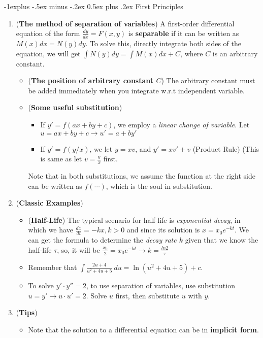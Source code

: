 \documentclass[10pt, landscape]{article}
\makeatletter
\renewcommand{\subsection}{\@startsection{subsection}{2}{0mm}%
                                {-1explus -.5ex minus -.2ex}%
                                {0.5ex plus .2ex}%
                                {\normalfont\normalsize\bfseries}}
\makeatother
\begin{document}
\begin{multicols}{4}
\subsection{First Principles}
\begin{enumerate}
    \item (\textbf{The method of separation of variables}) A first-order differential equation of the form $\frac{dy}{dx}=F(x,y)$ is \textbf{separable} if it can be written as $M(x)dx=N(y)dy$. To solve this, directly integrate both sides of the equation, we will get $\int N(y)dy=\int M(x)dx+C$, where $C$ is an arbitrary constant.
    \begin{itemize}
        \item (\textbf{The position of arbitrary constant $C$}) The arbitrary constant must be added immediately when you integrate w.r.t independent variable.
        \item (\textbf{Some useful substitution})
        \begin{itemize}
            \item If $y'=f(ax+by+c)$, we employ a \textit{linear change of variable}. Let $u=ax+by+c\rightarrow u'=a+by'$
            \item If $y'=f(y/x)$, we let $y=xv$, and $y'=xv'+v$ (Product Rule) (This is same as let $v=\frac{y}{x}$ first.
        \end{itemize}
        Note that in both substitutions, we assume the function at the right side can be written as $f(\cdots)$, which is the soul in substitution.
    \end{itemize}
    \item (\textbf{Classic Examples})
    \begin{itemize}
        \item (\textbf{Half-Life}) The typical scenario for half-life is \textit{exponential decay}, in which we have $\frac{dx}{dt}=-kx,k>0$ and since its solution is $x=x_0e^{-kt}$. We can get the formula to determine the \textit{decay rate $k$} given that we know the half-life $\tau$, so, it will be $\frac{x_0}{2}=x_0e^{-kt}\rightarrow k=\frac{ln2}{\tau}$
        \item Remember that $\int\frac{2u+4}{u^2+4u+5}~du=\ln(u^2+4u+5)+c$.
        \item To solve $y'\cdot y''=2$, to use separation of variables, use substitution $u=y'\rightarrow u\cdot u'=2$. Solve $u$ first, then substitute $u$ with $y$.
    \end{itemize}
    \item (\textbf{Tips})
    \begin{itemize}
        \item Note that the solution to a differential equation can be in \textbf{implicit form}.
    \end{itemize}
\end{enumerate}

\end{multicols}
\end{document}
